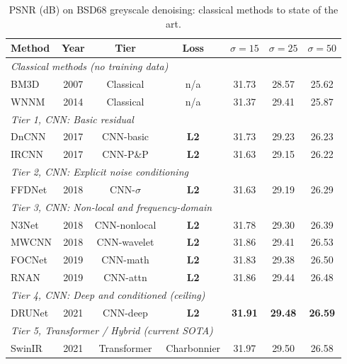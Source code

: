 \documentclass[12pt, a4paper, twoside, openright]{book}
\begin{document}
\begin{table}[H]
  \centering
  \caption{PSNR (dB) on BSD68 greyscale denoising: classical methods to state of the art.}
  \label{tab:lit:architectures}
  \small
  \begin{tabular}{l c c c c c c}
    \toprule
    \textbf{Method} & \textbf{Year} & \textbf{Tier} & \textbf{Loss} &
    \textbf{$\sigma=15$} & \textbf{$\sigma=25$} & \textbf{$\sigma=50$} \\
    \midrule
    \multicolumn{7}{l}{\textit{Classical methods (no training data)}} \\
    BM3D           & 2007 & Classical     & n/a         & 31.73 & 28.57 & 25.62 \\
    WNNM           & 2014 & Classical     & n/a         & 31.37 & 29.41 & 25.87 \\
    \midrule
    \multicolumn{7}{l}{\textit{Tier 1, CNN: Basic residual}} \\
    DnCNN          & 2017 & CNN-basic     & \textbf{L2} & 31.73 & 29.23 & 26.23 \\
    IRCNN          & 2017 & CNN-P\&P      & \textbf{L2} & 31.63 & 29.15 & 26.22 \\
    \midrule
    \multicolumn{7}{l}{\textit{Tier 2, CNN: Explicit noise conditioning}} \\
    FFDNet         & 2018 & CNN-$\sigma$  & \textbf{L2} & 31.63 & 29.19 & 26.29 \\
    \midrule
    \multicolumn{7}{l}{\textit{Tier 3, CNN: Non-local and frequency-domain}} \\
    N3Net          & 2018 & CNN-nonlocal  & \textbf{L2} & 31.78 & 29.30 & 26.39 \\
    MWCNN          & 2018 & CNN-wavelet   & \textbf{L2} & 31.86 & 29.41 & 26.53 \\
    FOCNet         & 2019 & CNN-math      & \textbf{L2} & 31.83 & 29.38 & 26.50 \\
    RNAN           & 2019 & CNN-attn      & \textbf{L2} & 31.86 & 29.44 & 26.48 \\
    \midrule
    \multicolumn{7}{l}{\textit{Tier 4, CNN: Deep and conditioned (ceiling)}} \\
    DRUNet         & 2021 & CNN-deep      & \textbf{L2} & \textbf{31.91} & \textbf{29.48} & \textbf{26.59} \\
    \midrule
    \multicolumn{7}{l}{\textit{Tier 5, Transformer / Hybrid (current SOTA)}} \\
    SwinIR         & 2021 & Transformer   & Charbonnier & 31.97 & 29.50 & 26.58 \\

\end{tabular}
\end{table}
\end{document}
